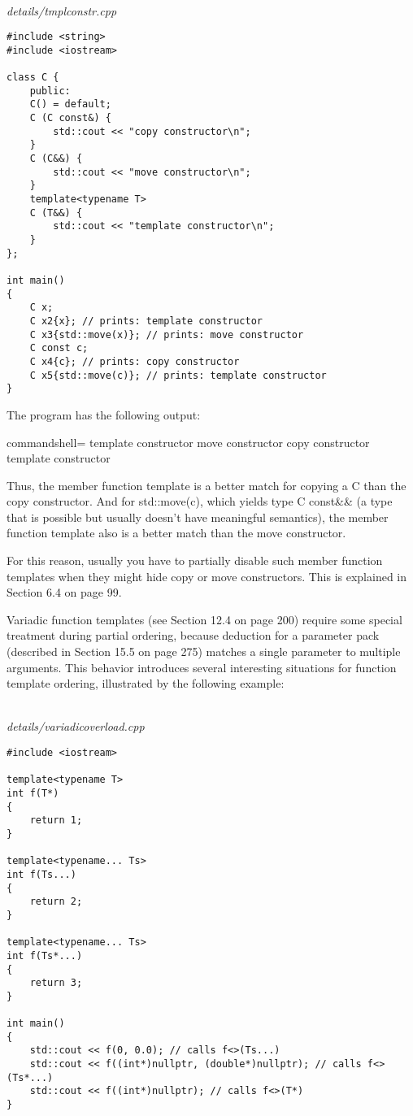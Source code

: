 \hspace*{\fill} \\ %
\noindent
\textit{details/tmplconstr.cpp}
\begin{lstlisting}[style=styleCXX]
#include <string>
#include <iostream>

class C {
	public:
	C() = default;
	C (C const&) {
		std::cout << "copy constructor\n";
	}
	C (C&&) {
		std::cout << "move constructor\n";
	}
	template<typename T>
	C (T&&) {
		std::cout << "template constructor\n";
	}
};

int main()
{
	C x;
	C x2{x}; // prints: template constructor
	C x3{std::move(x)}; // prints: move constructor
	C const c;
	C x4{c}; // prints: copy constructor
	C x5{std::move(c)}; // prints: template constructor
}
\end{lstlisting}

The program has the following output:

\begin{tcblisting}{commandshell={}}
template constructor
move constructor
copy constructor
template constructor
\end{tcblisting}

Thus, the member function template is a better match for copying a C than the copy constructor. And for std::move(c), which yields type C const\&\& (a type that is possible but usually doesn’t have meaningful semantics), the member function template also is a better match than the move constructor.

For this reason, usually you have to partially disable such member function templates when they might hide copy or move constructors. This is explained in Section 6.4 on page 99.



Variadic function templates (see Section 12.4 on page 200) require some special treatment during partial ordering, because deduction for a parameter pack (described in Section 15.5 on page 275) matches a single parameter to multiple arguments. This behavior introduces several interesting situations for function template ordering, illustrated by the following example:

\hspace*{\fill} \\ %
\noindent
\textit{details/variadicoverload.cpp}
\begin{lstlisting}[style=styleCXX]
#include <iostream>

template<typename T>
int f(T*)
{
	return 1;
}

template<typename... Ts>
int f(Ts...)
{
	return 2;
}

template<typename... Ts>
int f(Ts*...)
{
	return 3;
}

int main()
{
	std::cout << f(0, 0.0); // calls f<>(Ts...)
	std::cout << f((int*)nullptr, (double*)nullptr); // calls f<>(Ts*...)
	std::cout << f((int*)nullptr); // calls f<>(T*)
}
\end{lstlisting}

